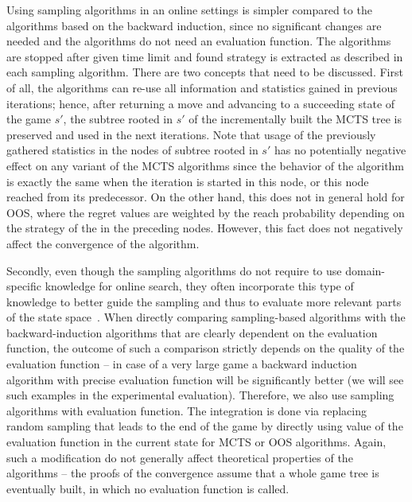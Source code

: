 Using sampling algorithms in an online settings is simpler compared to the algorithms based on the backward induction, since no significant changes are needed and the algorithms do not need an evaluation function.
The algorithms are stopped after given time limit and found strategy is extracted as described in each sampling algorithm.
There are two concepts that need to be discussed. 
First of all, the algorithms can re-use all information and statistics gained in previous iterations; hence, after returning a move and advancing to a succeeding state of the game $s'$, the subtree rooted in $s'$ of the incrementally built the MCTS tree is preserved and used in the next iterations. 
Note that usage of the previously gathered statistics in the nodes of subtree rooted in $s'$ has no potentially negative effect on any variant of the MCTS algorithms since the behavior of the algorithm is exactly the same when the iteration is started in this node, or this node reached from its predecessor. On the other hand, this does not in general hold for OOS, where the regret values are weighted by the reach probability depending on the strategy of the in the preceding nodes. However, this fact does not negatively affect the convergence of the algorithm.

Secondly, even though the sampling algorithms do not require to use domain-specific knowledge for online search, they often incorporate this type of knowledge to better guide the sampling and thus to evaluate more relevant parts of the state space~\cite{}. When directly comparing sampling-based algorithms with the backward-induction algorithms that are clearly dependent on the evaluation function, the outcome of such a comparison strictly depends on the quality of the evaluation function -- in case of a very large game a backward induction algorithm with precise evaluation function will be significantly better (we will see such examples in the experimental evaluation). Therefore, we also use sampling algorithms with evaluation function. The integration is done via replacing random sampling that leads to the end of the game by directly using value of the evaluation function in the current state for MCTS or OOS algorithms. Again, such a modification do not generally affect theoretical properties of the algorithms -- the proofs of the convergence assume that a whole game tree is eventually built, in which no evaluation function is called.
